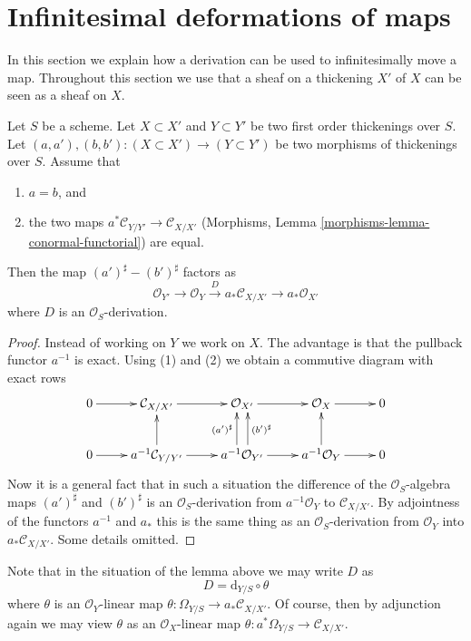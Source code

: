 \section{Infinitesimal deformations of maps}
\label{section-action-by-derivations}

\noindent
In this section we explain how a derivation can be used to
infinitesimally move a map. Throughout this section we use that
a sheaf on a thickening $X'$ of $X$ can be seen as a sheaf on $X$.

\begin{lemma}
\label{lemma-difference-derivation}
Let $S$ be a scheme.
Let $X \subset X'$ and $Y \subset Y'$ be two first order thickenings
over $S$. Let $(a, a'), (b, b') : (X \subset X') \to (Y \subset Y')$
be two morphisms of thickenings over $S$. Assume that
\begin{enumerate}
\item $a = b$, and
\item the two maps $a^*\mathcal{C}_{Y/Y'} \to \mathcal{C}_{X/X'}$
(Morphisms, Lemma \ref{morphisms-lemma-conormal-functorial})
are equal.
\end{enumerate}
Then the map $(a')^\sharp - (b')^\sharp$ factors as
$$
\mathcal{O}_{Y'} \to \mathcal{O}_Y \xrightarrow{D}
a_*\mathcal{C}_{X/X'} \to a_*\mathcal{O}_{X'}
$$
where $D$ is an $\mathcal{O}_S$-derivation.
\end{lemma}

\begin{proof}
Instead of working on $Y$ we work on $X$. The advantage is that the pullback
functor $a^{-1}$ is exact. Using (1) and (2) we obtain a commutive diagram
with exact rows
$$
\xymatrix{
0 \ar[r] &
\mathcal{C}_{X/X'} \ar[r] &
\mathcal{O}_{X'} \ar[r] &
\mathcal{O}_X \ar[r] & 0 \\
0 \ar[r] &
a^{-1}\mathcal{C}_{Y/Y'} \ar[r] \ar[u] &
a^{-1}\mathcal{O}_{Y'}
\ar[r] \ar@<1ex>[u]^{(a')^\sharp} \ar@<-1ex>[u]_{(b')^\sharp} &
a^{-1}\mathcal{O}_Y \ar[r] \ar[u] & 0
}
$$
Now it is a general fact that in such a situation the difference of the
$\mathcal{O}_S$-algebra maps $(a')^\sharp$ and $(b')^\sharp$ is an
$\mathcal{O}_S$-derivation from $a^{-1}\mathcal{O}_Y$ to $\mathcal{C}_{X/X'}$.
By adjointness of the functors $a^{-1}$ and $a_*$ this is the same
thing as an $\mathcal{O}_S$-derivation from
$\mathcal{O}_Y$ into $a_*\mathcal{C}_{X/X'}$. Some details omitted.
\end{proof}

\noindent
Note that in the situation of the lemma above we may write
$D$ as
\begin{equation}
\label{equation-D}
D = \text{d}_{Y/S} \circ \theta
\end{equation}
where $\theta$ is an $\mathcal{O}_Y$-linear map
$\theta : \Omega_{Y/S} \to a_*\mathcal{C}_{X/X'}$.
Of course, then by adjunction again we may view $\theta$ as an
$\mathcal{O}_X$-linear map
$\theta : a^*\Omega_{Y/S} \to \mathcal{C}_{X/X'}$.

